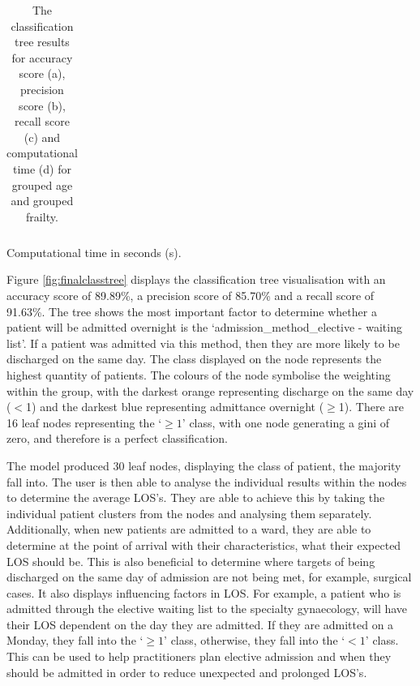 \documentclass[../thesis.tex]{subfiles}
\begin{document}
\begin{table}[h!]
\begin{subtable}{.49\linewidth}
{\begin{tabular}{ccx{1.6cm}x{1.6cm}x{1.6cm}x{1.6cm}x{1.6cm}x{1.6cm}}
    \end{tabular}}
    \caption{Computational time in seconds (s).}
    \label{tab:classtree6d}

\end{subtable}

\label{tab:classtree5}
\caption{The classification tree results for accuracy score (a), precision score (b), recall score (c) and computational time (d) for grouped age and grouped frailty.}
\end{table}

Figure \ref{fig:finalclasstree} displays the classification tree visualisation with an accuracy score of 89.89\%, a precision score of 85.70\% and a recall score of 91.63\%. The tree shows the most important factor to determine whether a patient will be admitted overnight is the `admission\_method\_elective - waiting list'. If a patient was admitted via this method, then they are more likely to be discharged on the same day. The class displayed on the node represents the highest quantity of patients. The colours of the node symbolise the weighting within the group, with the darkest orange representing discharge on the same day ($<$1) and the darkest blue representing admittance overnight ($\geq$1). There are 16 leaf nodes representing the `$\geq1$' class, with one node generating a gini of zero, and therefore is a perfect classification.

The model produced 30 leaf nodes, displaying the class of patient, the majority fall into. The user is then able to analyse the individual results within the nodes to determine the average LOS's. They are able to achieve this by taking the individual patient clusters from the nodes and analysing them separately. Additionally, when new patients are admitted to a ward, they are able to determine at the point of arrival with their characteristics, what their expected LOS should be. This is also beneficial to determine where targets of being discharged on the same day of admission are not being met, for example, surgical cases. It also displays influencing factors in LOS. For example, a patient who is admitted through the elective waiting list to the specialty gynaecology, will have their LOS dependent on the day they are admitted. If they are admitted on a Monday, they fall into the `$\geq1$' class, otherwise, they fall into the `$<1$' class. This can be used to help practitioners plan elective admission and when they should be admitted in order to reduce unexpected and prolonged LOS's.
\end{document}

